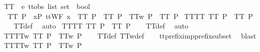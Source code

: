 \begin{isabellebody}
\isamarkupfalse%
%
\endisatagproof
{\isafoldproof}%
%
\isadelimproof
\isanewline
%
\endisadelimproof
\isanewline
{}\isamarkupfalse%
\ TT\ {\isacharcolon}{\isacharcolon}\ {\isachardoublequoteopen}{\isacharprime}e\ ttobs\ list\ set\ {\isasymRightarrow}\ bool{\isachardoublequoteclose}\ \isanewline
\ \ {\isachardoublequoteopen}TT\ P\ {\isacharequal}\ {\isacharparenleft}{\isacharparenleft}{\isasymforall}x{\isasymin}P{\isachardot}\ ttWF\ x{\isacharparenright}\ {\isasymand}\ TT{}\ P\ {\isasymand}\ TT{}\ P\ {\isasymand}\ TT{}w\ P\ {\isasymand}\ TT{}\ P{\isacharparenright}{\isachardoublequoteclose}\isanewline
\isanewline
{}\isamarkupfalse%
\ TT{\isacharunderscore}TT{}{\isacharcolon}\ {\isachardoublequoteopen}TT\ P\ {\isasymLongrightarrow}\ TT{}\ P{\isachardoublequoteclose}\isanewline
%
\isadelimproof
\ \ %
\endisadelimproof
%
\isatagproof
{}\isamarkupfalse%
\ TT{\isacharunderscore}def\ \isamarkupfalse%
\ auto%
\endisatagproof
{\isafoldproof}%
%
\isadelimproof
\isanewline
%
\endisadelimproof
\isanewline
{}\isamarkupfalse%
\ TT{\isacharunderscore}TT{}{\isacharcolon}\ {\isachardoublequoteopen}TT\ P\ {\isasymLongrightarrow}\ TT{}\ P{\isachardoublequoteclose}\isanewline
%
\isadelimproof
\ \ %
\endisadelimproof
%
\isatagproof
{}\isamarkupfalse%
\ TT{\isacharunderscore}def\ \isamarkupfalse%
\ auto%
\endisatagproof
{\isafoldproof}%
%
\isadelimproof
\isanewline
%
\endisadelimproof
\isanewline
{}\isamarkupfalse%
\ TT{}{\isacharunderscore}TT{}w{\isacharcolon}\ {\isachardoublequoteopen}TT{}\ P\ {\isasymLongrightarrow}\ TT{}w\ P{\isachardoublequoteclose}\isanewline
%
\isadelimproof
\ \ %
\endisadelimproof
%
\isatagproof
{}\isamarkupfalse%
\ TT{}{\isacharunderscore}def\ TT{}w{\isacharunderscore}def\isanewline
\ \ \isamarkupfalse%
\ tt{\isacharunderscore}prefix{\isacharunderscore}imp{\isacharunderscore}prefix{\isacharunderscore}subset\ \isamarkupfalse%
\ blast%
\endisatagproof
{\isafoldproof}%
%
\isadelimproof
\isanewline
%
\endisadelimproof
\isanewline
{}\isamarkupfalse%
\ TT{\isacharunderscore}TT{}w{\isacharcolon}\ {\isachardoublequoteopen}TT\ P\ {\isasymLongrightarrow}\ TT{}w\ P{\isachardoublequoteclose}\isanewline
%
\isadelimproof
\ \ %
\endisadelimproof
%

\end{isabellebody}
